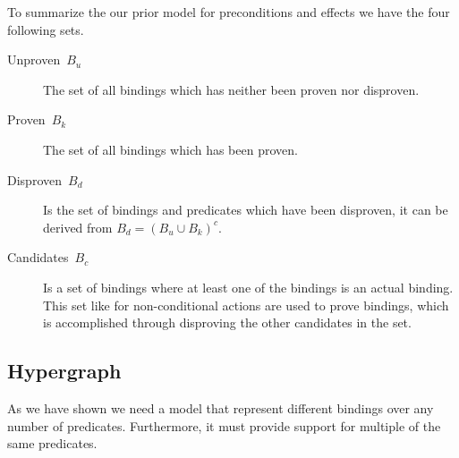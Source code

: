 \documentclass[../Master.tex]{subfiles}
\begin{document}
%
%
%

To summarize the our prior model for preconditions and effects we have the four following sets.
\begin{description}
	\item [{Unproven~$B_u$}] The set of all bindings which has
	neither been proven nor disproven.
	\item [{Proven~$B_k$}] The set of all bindings which has been
	proven.
	\item [{Disproven~$B_d$}] Is the set of bindings and predicates which have
	been disproven, it can be derived from $B_d={\left( B_u \cup B_k \right)}^c$.
	\item [{Candidates~$B_c$}] Is a set of bindings where at least one of the bindings is an actual binding.
	This set like for non-conditional actions are used to prove bindings,
	which is accomplished through disproving the other candidates in the set.
\end{description}


	\subsection*{Hypergraph}
	As we have shown we need a model that represent different bindings over any number of predicates.
	Furthermore, it must provide support for multiple of the same predicates.
\end{document}
